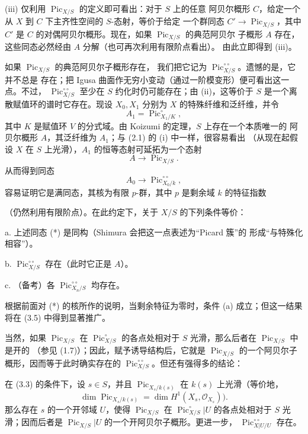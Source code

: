 (iii) 仅利用 $\operatorname{Pic}_{X/S}$ 的定义即可看出：对于 $S$ 上的任意
阿贝尔概形 $C$，给定一个从 $X$ 到 $C$ 下主齐性空间的 $S$-态射，等价于给定
一个群同态 $C'\longrightarrow\operatorname{Pic}_{X/S}$，其中 $C'$ 是 $C$
的对偶阿贝尔概形。现在，如果 $\operatorname{Pic}_{X/S}$ 的典范阿贝尔
子概形 $A$ 存在，这些同态必然经由 $A$ 分解（也可再次利用有限阶点看出）。
由此立即得到 (iii)。

 如果 $\operatorname{Pic}_{X/S}$ 的典范阿贝尔子概形存在，
我们把它记为 $\operatorname{Pic}_{X/S}^{\circ\circ}$。遗憾的是，它并不总是
存在；把 Igusa 曲面作无穷小变动（通过一阶模变形）便可看出这一点。不过，
$\operatorname{Pic}_{X/S}^{\circ\circ}$ 至少在 $S$ 约化时仍可能存在；由
(ii)，这等价于 $S$ 是一个离散赋值环的谱时它存在。现设 $X_0,X_1$ 分别为
$X$ 的特殊纤维和泛纤维，并令
\[
A_1=\operatorname{Pic}_{X_1/K}^\circ,
\]
其中 $K$ 是赋值环 $V$ 的分式域。由 Koizumi 的定理，$S$ 上存在一个本质唯一的
阿贝尔概形 $A$，其泛纤维为 $A_1$；与 (2.1) 的 (i) 中一样，很容易看出
（从现在起假设 $X$ 在 $S$ 上光滑），$A_1$ 的恒等态射可延拓为一个态射
\[
A\longrightarrow\operatorname{Pic}_{X/S}.
\]
从而得到同态
\[
\tag{*}A_0\longrightarrow\operatorname{Pic}_{X_0/k}^{\circ\circ},
\]
容易证明它是满同态，其核为有限 $p$-群，其中 $p$ 是剩余域 $k$ 的特征指数

（仍然利用有限阶点）。在此约定下，关于 $X/S$ 的下列条件等价：

\medskip
\noindent a. 上述同态 (*) 是同构（Shimura 会把这一点表述为“Picard 簇”的
形成“与特殊化相容”）。

\noindent b. $\operatorname{Pic}_{X/S}^{\circ\circ}$ 存在（此时它正是 $A$）。

\noindent c. （备考）各 $\operatorname{Pic}_{X_n/S}^{\circ\circ}$ 均存在。

根据前面对 (*) 的核所作的说明，当剩余特征为零时，条件 (a) 成立；但这一结果
将在 (3.5) 中得到显著推广。

当然，如果 $\operatorname{Pic}_{X/S}$ 在 $\operatorname{Pic}_{X/S}^\circ$
的各点处相对于 $S$ 光滑，那么后者在 $\operatorname{Pic}_{X/S}$ 中是开的
（参见 (1.7)）；因此，赋予诱导结构后，它就是 $\operatorname{Pic}_{X/S}$
的一个阿贝尔子概形，因而等于此时确实存在的
$\operatorname{Pic}_{X/S}^{\circ\circ}$。但还有强得多的结论：

 在 (3.3) 的条件下，设 $s\in S$，并且
$\operatorname{Pic}_{X_s/k(s)}$ 在 $k(s)$ 上光滑（等价地，
\[
\dim\operatorname{Pic}_{X_s/k(s)}=\dim H^1(X_s,\mathcal O_{X_s})).
\]
那么存在 $s$ 的一个开邻域 $U$，使得 $\operatorname{Pic}_{X/S}$ 在
$\operatorname{Pic}_{X/S}^\circ|U$ 的各点处相对于 $S$ 光滑；因而后者是
$\operatorname{Pic}_{X/S}|U$ 的一个开阿贝尔子概形。更进一步，
$\operatorname{Pic}_{X|U/U}^{\circ\circ}$ 存在。

